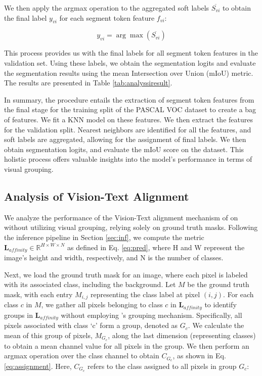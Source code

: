We then apply the argmax operation to the aggregated soft labels $\overline{S_{vi}}$ to obtain the final label $y_{vi}$ for each segment token feature $f_{vi}$:

\begin{equation}
\label{eq:labelassign}
y_{vi} = \arg\max(\overline{S_{vi}})
\end{equation}

This process provides us with the final labels for all segment token features in the validation set. Using these labels, we obtain the segmentation logits and evaluate the segmentation results using the mean Intersection over Union (mIoU) metric. The results are presented in Table \ref{tab:analyssiresult}.

In summary, the procedure entails the extraction of segment token features from the final stage for the training split of the PASCAL VOC dataset to create a bag of features. We fit a KNN model on these features. We then extract the features for the validation split. Nearest neighbors are identified for all the features, and soft labels are aggregated, allowing for the assignment of final labels. We then obtain segmentation logits, and evaluate the mIoU score on the dataset. This holistic process offers valuable insights into the model's performance in terms of visual grouping.


\subsection{Analysis of Vision-Text Alignment}
 
We analyze the performance of the Vision-Text alignment mechanism of \gvit on \pvoc without utilizing visual grouping, relying solely on ground truth masks. Following the inference pipeline in Section \ref{sec:inf}, we compute the metric $\textbf{L}_{affinity} \in \mathbb{R}^{ H \times W \times N }$ as defined in Eq. \ref{eq:pred}, where H and W represent the image's height and width, respectively, and N is the number of classes.

Next, we load the ground truth mask for an image, where each pixel is labeled with its associated class, including the background. Let $M$ be the ground truth mask, with each entry $M_{i,j}$ representing the class label at pixel $(i,j)$. For each class $c$ in $M$, we gather all pixels belonging to class $c$ in $\textbf{L}_{affinity}$ to identify groups in $\textbf{L}_{affinity}$ without employing \gvit's grouping mechanism. Specifically, all pixels associated with class `c' form a group, denoted as $G_c$. We calculate the mean of this group of pixels, $M_{G_c}$, along the last dimension (representing classes) to obtain a mean channel value for all pixels in the group. We then perform an argmax operation over the class channel to obtain $C_{G_c}$, as shown in Eq. \ref{eq:assignment}. Here, $C_{G_c}$ refers to the class assigned to all pixels in group $G_c$:

